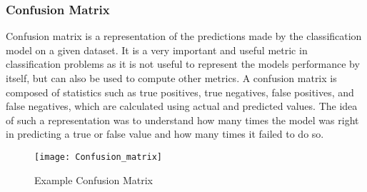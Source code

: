 \documentclass[11pt,openright]{report}
\begin{document}
\subsubsection {Confusion Matrix}
Confusion matrix is a representation of the predictions made by the classification model on a given dataset. It is a very important and useful metric in classification problems as it is not useful to represent the models performance by itself, but can also be used to compute other metrics. A confusion matrix is composed of statistics such as true positives, true negatives, false positives, and false negatives, which are calculated using actual and predicted values. The idea of such a representation was to understand how many times the model was right in predicting a true or false value and how many times it failed to do so.

  \begin{figure}[!htbp]
	\centering
	\texttt{[image: Confusion\_matrix]}
	\caption{Example Confusion Matrix}
	\label{fig:example_confusion_matrix}
\end{figure} 
\end{document}
